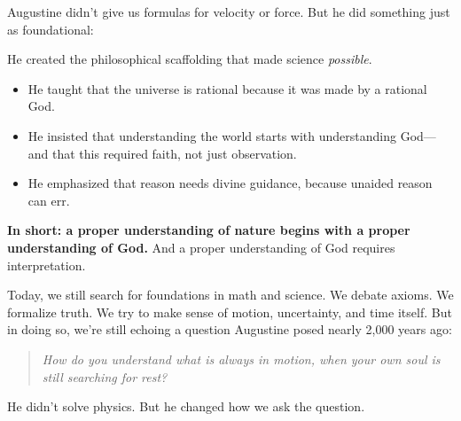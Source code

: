 Augustine didn’t give us formulas for velocity or force. But he did something just as foundational:

He created the philosophical scaffolding that made science \textit{possible}.

\begin{itemize}
  \item He taught that the universe is rational because it was made by a rational God.
  \item He insisted that understanding the world starts with understanding God—and that this required faith, not just observation.
  \item He emphasized that reason needs divine guidance, because unaided reason can err.
\end{itemize}

\textbf{In short: a proper understanding of nature begins with a proper understanding of God.}  
And a proper understanding of God requires interpretation.

\medskip

Today, we still search for foundations in math and science. We debate axioms. We formalize truth. We try to make sense of motion, uncertainty, and time itself. But in doing so, we’re still echoing a question Augustine posed nearly 2,000 years ago:

\begin{quote}
\emph{How do you understand what is always in motion, when your own soul is still searching for rest?}
\end{quote}

He didn’t solve physics. But he changed how we ask the question.

